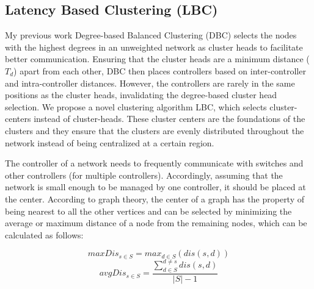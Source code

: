 \documentclass{IEEEtran}
\begin{document}
	\subsection{Latency Based Clustering (LBC)} \label{lbc}
	
	My previous work Degree-based Balanced Clustering (DBC) \cite{aziz2019degree} selects the nodes with the highest degrees in an unweighted network as cluster heads to facilitate better communication. Ensuring that the cluster heads are a minimum distance ($T_d$) apart from each other, DBC then places controllers based on inter-controller and intra-controller distances. However, the controllers are rarely in the same positions as the cluster heads, invalidating the degree-based cluster head selection. We propose a novel clustering algorithm LBC, which selects cluster-centers instead of cluster-heads. These cluster centers are the foundations of the clusters and they ensure that the clusters are evenly distributed throughout the network instead of being centralized at a certain region.
	
	The controller of a network needs to frequently communicate with switches and other controllers (for multiple controllers). Accordingly, assuming that the network is small enough to be managed by one controller, it should be placed at the center. According to graph theory, the center of a graph has the property of being nearest to all the other vertices \cite{wilson1979introduction} and can be selected by minimizing the average or maximum distance of a node from the remaining nodes, which can be calculated as follows:
	
	\begin{equation} \label{eqn:maxDis}
		maxDis_{s\in S} = max_{d\in S}(dis(s,d))
	\end{equation}
	\begin{equation} \label{eqn:avgDis}
		avgDis_{s \in S} = \frac{\sum_{d\in S}^{d\ne s}dis(s,d)}{|S|-1}
	\end{equation}
	
\end{document}
